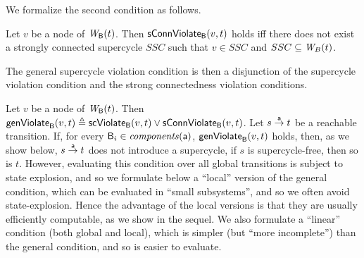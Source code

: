 \en



We formalize the second condition as follows.

\label{def:sConn.violation}
 Let $v$ be a node of $\wfg{\B}{t}$.   Then $\connViol{v}{t}$ holds iff there does not exist a 
strongly connected
 supercycle $SSC$ such that $v \in SSC$ and $SSC \sub \wfg{B}{t}$.
\ed






The general supercycle violation condition is then a disjunction of the supercycle violation condition
and the strong connectedness violation conditions.


\label{def:formation.violation} 
\label{defn:formation.violation} 
Let $v$ be a node of $\wfg{\B}{t}$.
Then 
$\genViol{v}{t}  \df \scV{v}{t}  \lor \connViol{v}{t}$.
\ed
%
Let $s \goesto[\act] t$ be a reachable transition. If, for every $\B_i \in \cmps{\act}$,
$\formViol{v}{t}$ holds, then, as we show below, $s \goesto[\act] t$ does not introduce a
supercycle, \ie if $s$ is supercycle-free, then so is $t$.  However, evaluating this condition over
all global transitions is subject to state explosion, and so we formulate below a ``local'' version
of the general condition, which can be evaluated in ``small subsystems'', and so we often avoid
state-explosion. Hence the advantage of the local versions is that they are usually efficiently
computable, as we show in the sequel.  We also formulate a ``linear'' condition (both global and
local), which is simpler (but ``more incomplete'') than the general condition, and so is easier to
evaluate.

